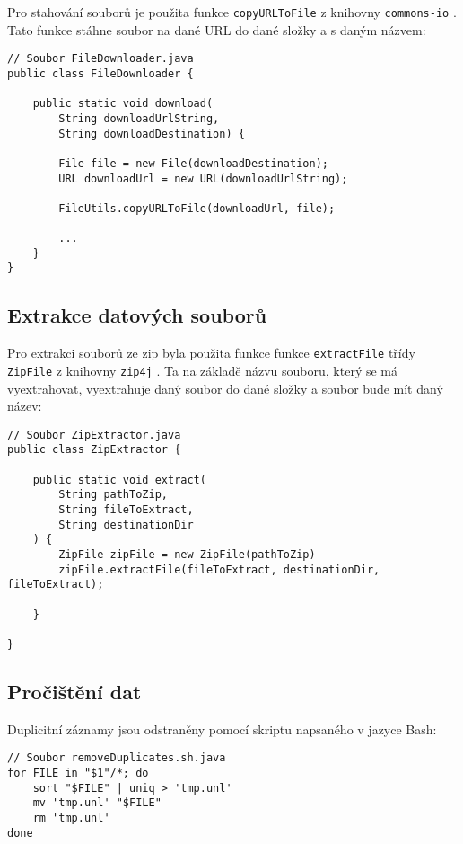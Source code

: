 \noindent Pro stahování souborů je použita funkce \lstinline|copyURLToFile| z knihovny \lstinline|commons-io| \cite{commons-io}. Tato funkce stáhne soubor na dané URL do dané složky a s daným názvem:

\newpage

\begin{lstlisting}[caption={Ukázka stahování dat pomocí knihovny \lstinline|commons-io|}, label={lst:common-io-downloader}, tabsize=2]
// Soubor FileDownloader.java
public class FileDownloader {
	
	public static void download(
		String downloadUrlString, 
		String downloadDestination) {
		
		File file = new File(downloadDestination);
		URL downloadUrl = new URL(downloadUrlString);
		
		FileUtils.copyURLToFile(downloadUrl, file);
	
		...
	}
}
\end{lstlisting}

\subsection*{Extrakce datových souborů}
Pro extrakci souborů ze zip byla použita funkce funkce \lstinline|extractFile| třídy \lstinline|ZipFile| z knihovny \lstinline|zip4j| \cite{zip4j}. Ta na základě názvu souboru, který se má vyextrahovat, vyextrahuje daný soubor do dané složky a soubor bude mít daný název:

\begin{lstlisting}[caption={Ukázka extrakce souborů ze zipu}, label={lst:zip4j}, tabsize=2]
// Soubor ZipExtractor.java
public class ZipExtractor {

	public static void extract(
		String pathToZip, 
		String fileToExtract, 
		String destinationDir
	) {
		ZipFile zipFile = new ZipFile(pathToZip)
		zipFile.extractFile(fileToExtract, destinationDir, fileToExtract);
		
	}
		
}
\end{lstlisting}

\subsection*{Pročištění dat}
Duplicitní záznamy jsou odstraněny pomocí skriptu napsaného v jazyce Bash:

\begin{lstlisting}[caption={Skript pro odstranění duplicitních řádků}, tabsize=2]
// Soubor removeDuplicates.sh.java
for FILE in "$1"/*; do
	sort "$FILE" | uniq > 'tmp.unl'
	mv 'tmp.unl' "$FILE"
	rm 'tmp.unl'
done
\end{lstlisting}

